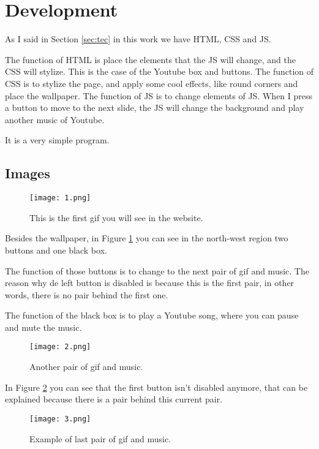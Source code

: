 \section{Development} %

As I said in Section \ref{sec:tec} in this work we have HTML, CSS and JS.

The function of HTML is place the elements that the JS will change, and the CSS will stylize. This is the case of the Youtube box and buttons. The function of CSS is to stylize the page, and apply some cool effects, like round corners and place the wallpaper. The function of JS is to change elements of JS. When I press a button to move to the next slide, the JS will change the background and play another music of Youtube.

It is a very simple program.


\subsection{Images} %

\begin{figure}[h]
\centering
\texttt{[image: 1.png]}
\caption{This is the first gif you will see in the website.}
\label{figure1}
\end{figure}

Besides the wallpaper, in Figure \ref{figure1} you can see in the north-west region two buttons and one black box.

The function of those buttons is to change to the next pair of gif and music. The reason why de left button is disabled is because this is the first pair, in other words, there is no pair behind the first one.

The function of the black box is to play a Youtube song, where you can pause and mute the music.

\begin{figure}[h]
\centering
\texttt{[image: 2.png]}
\caption{Another pair of gif and music.}
\label{figure2}
\end{figure}

In Figure \ref{figure2} you can see that the first button isn't disabled anymore, that can be explained because there is a pair behind this current pair.

\begin{figure}[H]
\centering
\texttt{[image: 3.png]}
\caption{Example of last pair of gif and music.}
\label{figure3}
\end{figure}


